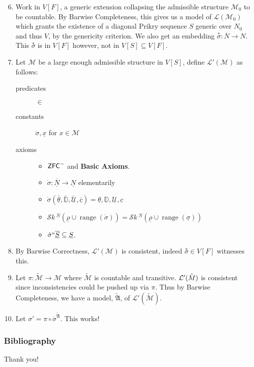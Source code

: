 \documentclass[utf8x,xcolor=svgnames,8pt]{beamer}
\newcommand{\M}{\mathcal{M}}
\newcommand{\D}{\mathbb{D}}
\newcommand{\N}{{\overline{N}}}
\renewcommand{\U}{\mathcal{U}}
\newcommand{\ZFC}{\textup{\ensuremath{\textsf{ZFC}}}}
\DeclareMathOperator{\ran}{range}
\newcommand{\To}{\longrightarrow}
\newcommand{\SH}{\mathcal{S}\textit{k} \,}
\newcommand{\sk}[3]{\SH^{#1}( {#2} \cup {\ran(#3)} ) }
\begin{document}
\begin{frame}
\begin{enumerate}\setcounter{enumi}{5}
	\item Work in $V[F]$, a generic extension collapsing the admissible structure $\mathcal M_0$ to be countable. By Barwise Completeness, this gives us a model of $\mathcal L(\M_0)$ which grants the existence of a diagonal Prikry sequence $S$ generic over $N_0$ and thus $V$, by the genericity criterion. We also get an embedding $\overset{*}\sigma: \N \To N$. This $\overset{*}\sigma$ is in $V[F]$ however, not in $V[S]\subseteq V[F]$.
	\item Let $\mathcal M$ be a large enough admissible structure in $V[S]$, define $\mathcal L'(\mathcal M)$ as follows: 
\begin{description}
	\item[predicates] $\in$ 
	\item[constants] $\dot{\sigma}, \underline x$ for $x \in \mathcal M$
	\item[axioms] \begin{itemize} \item $\ZFC^-$ and \textbf{Basic Axioms}.
		\item $\dot \sigma : \overline{\underline N} \To \underline N$ elementarily
		\item $\dot{\sigma}(\overline{\underline{\theta}}, \overline{\underline{\D}}, \overline{\underline{\U}}, \overline{\underline c})=\underline{\theta}, \underline{\D}, \underline{\U}, \underline{c}$
		\item $\sk{\underline N}{\underline \rho}{\dot{\sigma}} = \sk{\underline N}{\underline \rho}{\underline \sigma}$
		\item $\dot \sigma ``\overline{\underline S} \subseteq \underline S$.
	\end{itemize}
\end{description}
	\item By Barwise Correctness, $\mathcal L'(\mathcal M)$ is consistent, indeed $\overset{*}\sigma \in V[F]$ witnesses this. 
	\item Let $\pi: \tilde{\mathcal M} \To \mathcal M$ where $\tilde{\mathcal M}$ is countable and transitive. $\mathcal L'(\tilde{\mathcal \M})$ is consistent since inconsistencies could be pushed up via $\pi$. Thus by Barwise Completeness, we have a model, $\tilde{\mathfrak A}$, of $\mathcal L'(\tilde{\mathcal M})$.
	\item Let $\sigma' =\pi \circ \dot{\sigma}^{\tilde{\mathfrak A}}$. This works! \qedhere
\end{enumerate}
\end{frame}




\begin{frame}
\frametitle{Bibliography}


\end{frame}

\begin{frame}
\center Thank you!
\end{frame}
\end{document}

